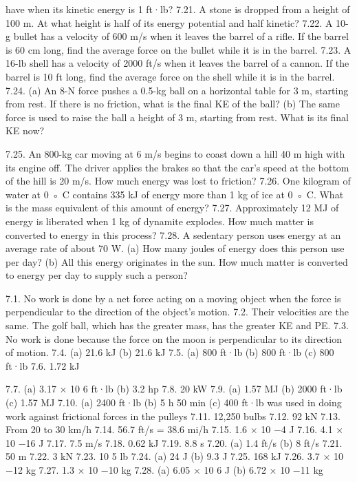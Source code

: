 have when its kinetic energy is 1 ft·lb?
7.21. A stone is dropped from a height of 100 m. At what height is half of its energy potential and half kinetic?
7.22. A 10-g bullet has a velocity of 600 m/s when it leaves the barrel of a rifle. If the barrel is 60 cm long, find the average
force on the bullet while it is in the barrel.
7.23. A 16-lb shell has a velocity of 2000 ft/s when it leaves the barrel of a cannon. If the barrel is 10 ft long, find the
average force on the shell while it is in the barrel.
7.24. (a) An 8-N force pushes a 0.5-kg ball on a horizontal table for 3 m, starting from rest. If there is no friction, what is
the final KE of the ball? (b) The same force is used to raise the ball a height of 3 m, starting from rest. What is its
final KE now?

7.25. An 800-kg car moving at 6 m/s begins to coast down a hill 40 m high with its engine off. The driver applies the brakes
so that the car’s speed at the bottom of the hill is 20 m/s. How much energy was lost to friction?
7.26. One kilogram of water at 0 ◦ C contains 335 kJ of energy more than 1 kg of ice at 0 ◦ C. What is the mass equivalent of
this amount of energy?
7.27. Approximately 12 MJ of energy is liberated when 1 kg of dynamite explodes. How much matter is converted to energy
in this process?
7.28. A sedentary person uses energy at an average rate of about 70 W. (a) How many joules of energy does this person
use per day? (b) All this energy originates in the sun. How much matter is converted to energy per day to supply such
a person?



7.1. No work is done by a net force acting on a moving object when the force is perpendicular to the direction of the
object’s motion.
7.2. Their velocities are the same. The golf ball, which has the greater mass, has the greater KE and PE.
7.3. No work is done because the force on the moon is perpendicular to its direction of motion.
7.4. (a) 21.6 kJ (b) 21.6 kJ
7.5. (a) 800 ft·lb (b) 800 ft·lb (c) 800 ft·lb
7.6. 1.72 kJ


7.7. (a) 3.17 × 10 6 ft·lb (b) 3.2 hp
7.8. 20 kW
7.9.  (a) 1.57 MJ (b) 2000 ft·lb (c) 1.57 MJ
7.10. (a) 2400 ft·lb (b) 5 h 50 min (c) 400 ft·lb was used in doing work against frictional forces in the pulleys
7.11. 12,250 bulbs
7.12. 92 kN
7.13. From 20 to 30 km/h
7.14. 56.7 ft/s = 38.6 mi/h
7.15. 1.6 × 10 −4 J
7.16. 4.1 × 10 −16 J
7.17. 7.5 m/s
7.18. 0.62 kJ
7.19. 8.8 s
7.20. (a) 1.4 ft/s (b) 8 ft/s
7.21. 50 m
7.22. 3 kN
7.23. 10 5 lb
7.24. (a) 24 J (b) 9.3 J
7.25. 168 kJ
7.26. 3.7 × 10 −12 kg
7.27. 1.3 × 10 −10 kg
7.28. (a) 6.05 × 10 6 J (b) 6.72 × 10 −11 kg












\endinput

